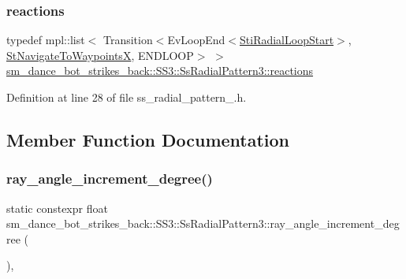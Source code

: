 \subsubsection{\texorpdfstring{reactions}{reactions}}
{\footnotesize\ttfamily typedef mpl\+::list$<$ Transition$<$Ev\+Loop\+End$<$\hyperlink{structsm__dance__bot__strikes__back_1_1radial__motion__states_1_1StiRadialLoopStart}{Sti\+Radial\+Loop\+Start}$>$, \hyperlink{structsm__dance__bot__strikes__back_1_1StNavigateToWaypointsX}{St\+Navigate\+To\+WaypointsX}, E\+N\+D\+L\+O\+OP$>$ $>$ \hyperlink{structsm__dance__bot__strikes__back_1_1SS3_1_1SsRadialPattern3_ac7bfc9daf522cdf03a39556fd9c43b7a}{sm\+\_\+dance\+\_\+bot\+\_\+strikes\+\_\+back\+::\+S\+S3\+::\+Ss\+Radial\+Pattern3\+::reactions}}



Definition at line 28 of file ss\+\_\+radial\+\_\+pattern\+\_.\+h.



\subsection{Member Function Documentation}
\mbox{\label{structsm__dance__bot__strikes__back_1_1SS3_1_1SsRadialPattern3_ac6a4333191cc9dfdb599ae9b24b35cbe}} 
\subsubsection{\texorpdfstring{ray\+\_\+angle\+\_\+increment\+\_\+degree()}{ray\_angle\_increment\_degree()}}
{\footnotesize\ttfamily static constexpr float sm\+\_\+dance\+\_\+bot\+\_\+strikes\+\_\+back\+::\+S\+S3\+::\+Ss\+Radial\+Pattern3\+::ray\+\_\+angle\+\_\+increment\+\_\+degree (\begin{DoxyParamCaption}{ }\end{DoxyParamCaption})\hspace{0.3cm}{\ttfamily [inline]}, {\ttfamily [static]}}



